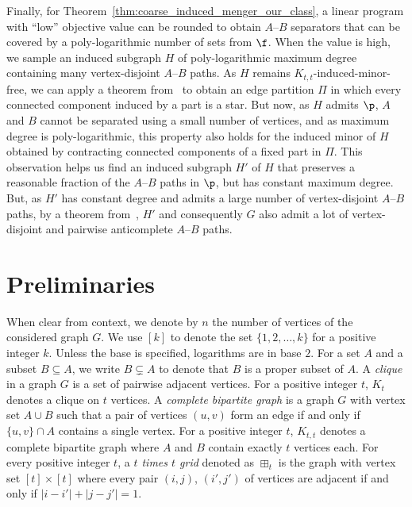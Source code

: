Finally, for Theorem~\ref{thm:coarse_induced_menger_our_class}, a linear program with ``low'' objective value can be rounded to obtain $A$--$B$ separators that can be covered by a poly-logarithmic number of sets from $\f$. When the value is high, we sample an induced subgraph $H$ of poly-logarithmic maximum degree containing many vertex-disjoint $A$--$B$ paths. As $H$ remains $K_{t,t}$-induced-minor-free, we can apply a theorem from~\cite{bonnet2023treewidth} to obtain an edge partition $\Pi$ in which every connected component induced by a part is a star. But now, as $H$ admits $\p$, $A$ and $B$ cannot be separated using a small number of vertices, and as maximum degree is poly-logarithmic, this property also holds for the induced minor of $H$ obtained by contracting connected components of a fixed part in $\Pi$. This observation helps us find an induced subgraph $H'$ of $H$ that preserves a reasonable fraction of the $A$--$B$ paths in $\p$, but has constant maximum degree. But, as $H'$ has constant degree and admits a large number of vertex-disjoint $A$--$B$ paths, by a theorem from~\cite{gartland2023inducedversionsmengerstheorem}, $H'$ and consequently $G$ also admit a lot of vertex-disjoint and pairwise anticomplete $A$--$B$ paths.



\section{Preliminaries}
When clear from context, we denote by $n$ the number of vertices of the considered graph $G$. We use $[k]$ to denote the set $\{1, 2, \dots, k\}$ for a positive integer $k$. Unless the base is specified, logarithms are in base $2$. For a set $A$ and a subset $B \subseteq A$, we write $B \subsetneq A$ to denote that $B$ is a proper subset of $A$.
% 
A {\em clique} in a graph $G$ is a set of pairwise adjacent vertices. For a positive integer $t$, $K_t$ denotes a clique on $t$ vertices. A \emph{complete bipartite graph} is a graph $G$ with vertex set $A\cup B$ such that a pair of vertices $(u,v)$ form an edge if and only if $\{u,v\}\cap A$ contains a single vertex. For a positive integer $t$, $K_{t,t}$ denotes a complete bipartite graph where $A$ and $B$ contain exactly $t$ vertices each. For every positive integer $t$, a \emph{$t$ times $t$ grid} denoted as $\boxplus_t$ is the graph with vertex set $[t] \times [t]$ where every pair $(i, j)$, $(i', j')$ of vertices are adjacent if and only if $|i-i'| + |j-j'| = 1$.

